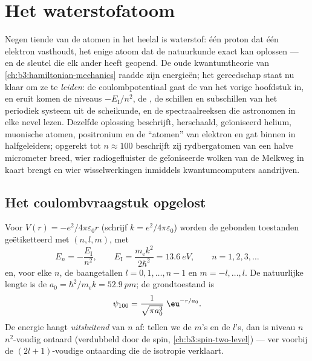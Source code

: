 \chapter{Het waterstofatoom}\label{ch:b3:hydrogen-atom}

Negen tiende van de atomen in het heelal is waterstof: één proton dat één
elektron vasthoudt, het enige atoom dat de natuurkunde exact kan oplossen
--- en de sleutel die elk ander heeft geopend. De oude kwantumtheorie van
\cref{ch:b3:hamiltonian-mechanics} raadde zijn energieën; het gereedschap
staat nu klaar om ze te \emph{leiden}: de coulombpotentiaal gaat de
 van het vorige hoofdstuk in, en eruit komen de
niveaus $-E_{\text{I}}/n^2$, de , de schillen en subschillen van
het periodiek systeem uit de scheikunde, en de spectraalreeksen die
astronomen in elke nevel lezen. Dezelfde oplossing beschrijft, herschaald,
geïoniseerd helium, muonische atomen, positronium en de ``atomen'' van
elektron en gat binnen in halfgeleiders; opgerekt tot $n
\approx 100$
beschrijft zij rydbergatomen van een halve micrometer breed, wier
radiogefluister de geïoniseerde wolken van de Melkweg in kaart brengt en
wier wisselwerkingen inmiddels kwantumcomputers aandrijven.

\section{Het coulombvraagstuk opgelost}

\begin{theorem}\label{thm:b3:hydrogen-atom:levels}
Voor $V(r) = -e^2/4\pi\varepsilon_0 r$ (schrijf $k = e^2/4\pi
\varepsilon_0$) worden de gebonden toestanden geëtiketteerd met $(n, l, m)$, met
\[
E_n = -\frac{E_{\text{I}}}{n^2} , \qquad
E_{\text{I}} = \frac{m_{\text{e}}k^2}{2\hbar^2} = \qty{13.6}{eV} ,
\qquad n = 1, 2, 3, \dots
\]
en, voor elke $n$, de baangetallen $l = 0, 1, \dots, n-1$ en
$m = -l, \dots, l$. De natuurlijke lengte is de  $a_0 =
\hbar^2/m_{\text{e}}k = \qty{52.9}{pm}$; de grondtoestand is
\[
\psi_{100} = \frac{1}{\sqrt{\pi a_0^3}}\;\eu^{-r/a_0} .
\]
De energie hangt \emph{uitsluitend} van $n$ af: tellen we de $m$'s en de
$l$'s, dan is niveau $n$ $n^2$-voudig ontaard (verdubbeld door de spin,
\cref{ch:b3:spin-two-level}) --- ver voorbij de $(2l+1)$-voudige
ontaarding die de isotropie verklaart.
\end{theorem}

